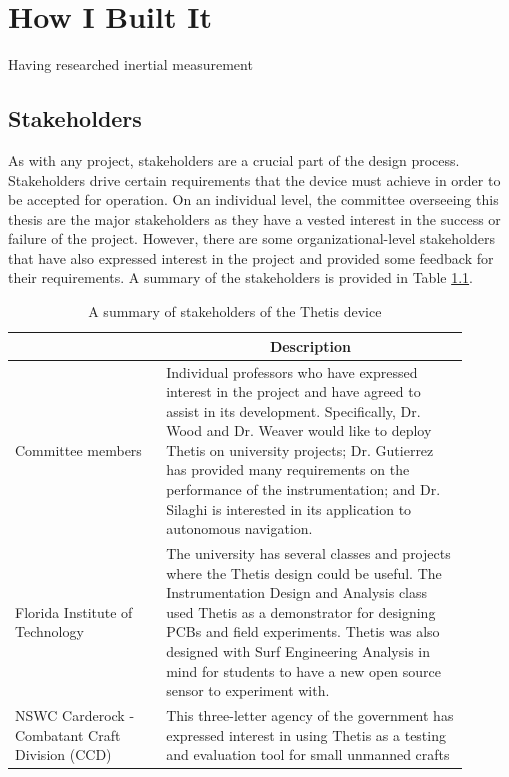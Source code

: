 \chapter{How I Built It} \label{chap:thetis_design}
Having researched inertial measurement

\section{Stakeholders} \label{sec:stakeholders}
As with any project, stakeholders are a crucial part of the design process.
Stakeholders drive certain requirements that the device must achieve in order to be accepted for operation.
On an individual level, the committee overseeing this thesis are the major stakeholders as they have a vested interest in the success or failure of the project.
However, there are some organizational-level stakeholders that have also expressed interest in the project and provided some feedback for their requirements.
A summary of the stakeholders is provided in Table \ref{tab:stakeholders}.

\begin{table}
	\caption{A summary of stakeholders of the Thetis device}
	\label{tab:stakeholders}
	\centering
	\begin{tabular}{|p{0.3\linewidth} | p{0.6\linewidth}|}
		\hline
		\rowcolor[gray]{0.8}
		\multicolumn{1}{|c|}{\textbf{Stakeholder}} & \multicolumn{1}{|c|}{\textbf{Description}} \\
		\hline
		Committee members & Individual professors who have expressed interest in the project and have agreed to assist in its development. Specifically, Dr. Wood and Dr. Weaver would like to deploy Thetis on university projects; Dr. Gutierrez has provided many requirements on the performance of the instrumentation; and Dr. Silaghi is interested in its application to autonomous navigation. \\
		\hline
		Florida Institute of \newline Technology & The university has several classes and projects where the Thetis design could be useful. The Instrumentation Design and Analysis class used Thetis as a demonstrator for designing PCBs and field experiments. Thetis was also designed with Surf Engineering Analysis in mind for students to have a new open source sensor to experiment with. \\
		\hline
		NSWC Carderock - \newline Combatant Craft Division (CCD) & This three-letter agency of the government has expressed interest in using Thetis as a testing and evaluation tool for small unmanned crafts \\
		\hline
	\end{tabular}
\end{table}

